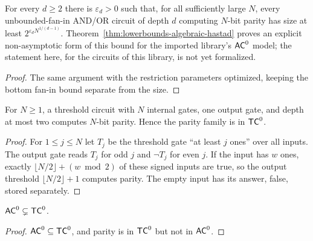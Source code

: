 \begin{theorem}
  \label{thm:lowerbounds-hastad-size}
  For every $d \ge 2$ there is $\varepsilon_d > 0$ such that, for all
  sufficiently large $N$, every unbounded-fan-in AND/OR circuit of depth $d$
  computing $N$-bit parity has size at least $2^{\varepsilon_d N^{1/(d-1)}}$.
  Theorem~\ref{thm:lowerbounds-algebraic-hastad} proves an explicit
  non-asymptotic form of this bound for the imported library's $\mathsf{AC}^0$
  model; the statement here, for the circuits of this library, is not yet
  formalized.
\end{theorem}
\begin{proof}
  The same argument with the restriction parameters optimized, keeping the
  bottom fan-in bound separate from the size.
\end{proof}

\begin{lemma}[Parity in $\cc{TC}^0$]
  \label{lem:lowerbounds-parity-tc0}
  \leanok
  For $N \ge 1$, a threshold circuit with $N$ internal gates, one output gate,
  and depth at most two computes $N$-bit parity. Hence the parity family is in
  $\cc{TC}^0$.
\end{lemma}
\begin{proof}
  \leanok
  For $1 \le j \le N$ let $T_j$ be the threshold gate ``at least $j$ ones''
  over all inputs. The output gate reads $T_j$ for odd $j$ and $\neg T_j$ for
  even $j$. If the input has $w$ ones, exactly
  $\lfloor N/2 \rfloor + (w \bmod 2)$ of these signed inputs are true, so the
  output threshold $\lfloor N/2 \rfloor + 1$ computes parity. The empty input
  has its answer, false, stored separately.
\end{proof}

\begin{corollary}
  \label{cor:lowerbounds-ac0-ne-tc0}
  \leanok
  $\mathsf{AC}^0 \subsetneq \mathsf{TC}^0$.
\end{corollary}
\begin{proof}
  \leanok
  $\mathsf{AC}^0 \subseteq \mathsf{TC}^0$, and parity is in $\cc{TC}^0$ but not in
  $\mathsf{AC}^0$.
\end{proof}

